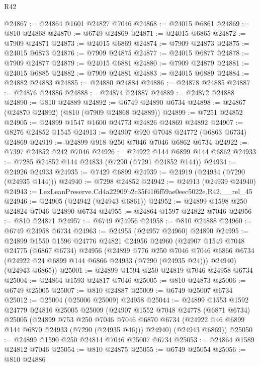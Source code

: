 \begin{lexlean}{R42}
\begin{coremodule}
{@24867 := @24864 @1601 @24827 @7046
@24868 := @24015 @6861
@24869 := @810 @24868
@24870 := @6749 @24869
@24871 := @24015 @6865
@24872 := @7909 @24871
@24873 := @24015 @6869
@24874 := @7909 @24873
@24875 := @24015 @6873
@24876 := @7909 @24875
@24877 := @24015 @6877
@24878 := @7909 @24877
@24879 := @24015 @6881
@24880 := @7909 @24879
@24881 := @24015 @6885
@24882 := @7909 @24881
@24883 := @24015 @6889
@24884 := @24882 @24883
@24885 := @24880 @24884
@24886 := @24878 @24885
@24887 := @24876 @24886
@24888 := @24874 @24887
@24889 := @24872 @24888
@24890 := @810 @24889
@24892 := @6749 @24890 @6734
@24898 := @24867 (@24870 @24892) (@810 (@7909 @24868 @24889))
@24899 := @7251 @24852
@24905 := @24899 @1547 @1600 @24773 @24826 @24869 @24892
@24907 := @8276 @24852 @1545
@24913 := @24907 @920 @7048 @24772 (@6863 @6734) @24869
@24919 := @24899 @918 @250 @7046 @7046 @6862 @6734
@24922 := @7397 @24852 @242 @7046
@24926 := @24922 @144 @6899 @144 @6862
@24933 := @7285 @24852 @144 @24833 (@7290 (@7291 @24852 @144))
@24934 := @24926 @24933
@24935 := @7429 @6899
@24939 := @24919 (@24934 (@7290 (@24935 @144)))
@24940 := @7298 @24852
@24942 := @24913 (@24939 @24940)
@24943 := LexLeanPreserve.Cd4a22909b2c35f41f6f59ae0eec5022e.R42.__rel_45
@24946 := @24905 (@24942 (@24943 @6861))
@24952 := @24899 @1598 @250 @24824 @7046 @24890 @6734
@24955 := @24864 @1597 @24822 @7046
@24956 := @810 @24871
@24957 := @6749 @24956
@24958 := @810 @24888
@24960 := @6749 @24958 @6734
@24963 := @24955 (@24957 @24960) @24890
@24995 := @24899
    @1550
    @1596
    @24776
    @24821
    @24956
    @24960
    (@24907
      @1549
      @7048
      @24775
      (@6867 @6734)
      @24956
      (@24899
        @776
        @250
        @7046
        @7046
        @6866
        @6734
        (@24922 @24 @6899 @144 @6866 @24933 (@7290 (@24935 @24)))
        @24940)
      (@24943 @6865))
@25001 := @24899 @1594 @250 @24819 @7046 @24958 @6734
@25004 := @24864 @1593 @24817 @7046
@25005 := @810 @24873
@25006 := @6749 @25005
@25007 := @810 @24887
@25009 := @6749 @25007 @6734
@25012 := @25004 (@25006 @25009) @24958
@25044 := @24899
    @1553
    @1592
    @24779
    @24816
    @25005
    @25009
    (@24907
      @1552
      @7048
      @24778
      (@6871 @6734)
      @25005
      (@24899
        @753
        @250
        @7046
        @7046
        @6870
        @6734
        (@24922 @46 @6899 @144 @6870 @24933 (@7290 (@24935 @46)))
        @24940)
      (@24943 @6869))
@25050 := @24899 @1590 @250 @24814 @7046 @25007 @6734
@25053 := @24864 @1589 @24812 @7046
@25054 := @810 @24875
@25055 := @6749 @25054
@25056 := @810 @24886
}
\end{coremodule}
\end{lexlean}
